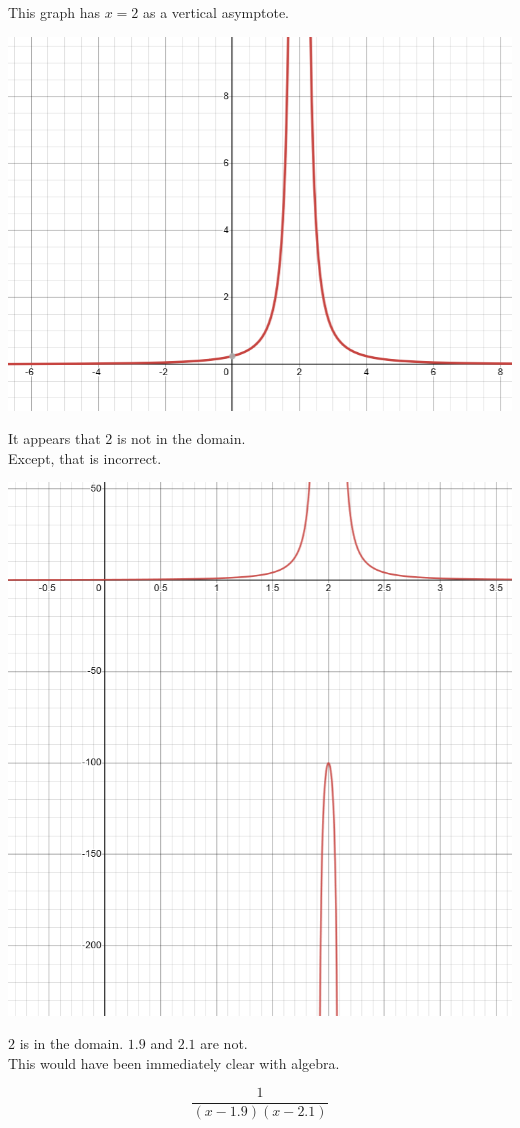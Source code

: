 \documentclass{ximera}
\begin{document}
\begin{example}


This graph has $x=2$ as a vertical asymptote.

\begin{image}
\includegraphics{pics/graph_2A.png}
\end{image}

It appears that $2$ is not in the domain. \\


Except, that is incorrect.

\begin{image}
\includegraphics{pics/graph_2B.png}
\end{image}


$2$ is in the domain. $1.9$ and $2.1$ are not. \\


This would have been immediately clear with algebra.

\[  \frac{1}{(x-1.9)(x-2.1)}     \]


\end{example}
\end{document}
